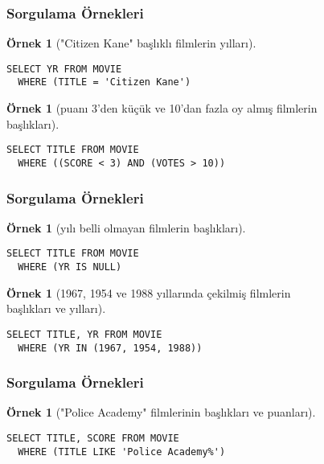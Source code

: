 \documentclass[dvipsnames]{beamer}
\theoremstyle{definition}
\theoremstyle{example}
\newtheorem{ornek}[theorem]{Örnek}
\theoremstyle{plain}
\begin{document}
\begin{frame}[fragile]
  \frametitle{Sorgulama Örnekleri}

  \begin{ornek}["Citizen Kane" başlıklı filmlerin yılları]
    \begin{lstlisting}
SELECT YR FROM MOVIE
  WHERE (TITLE = 'Citizen Kane')
    \end{lstlisting}
  \end{ornek}

  \pause
  \begin{ornek}[puanı 3'den küçük ve 10'dan fazla oy almış filmlerin\\
                başlıkları]
    \begin{lstlisting}
SELECT TITLE FROM MOVIE
  WHERE ((SCORE < 3) AND (VOTES > 10))
    \end{lstlisting}
  \end{ornek}
\end{frame}

\begin{frame}[fragile]
  \frametitle{Sorgulama Örnekleri}

  \begin{ornek}[yılı belli olmayan filmlerin başlıkları]
    \begin{lstlisting}
SELECT TITLE FROM MOVIE
  WHERE (YR IS NULL)
    \end{lstlisting}
  \end{ornek}

  \pause
  \begin{ornek}[1967, 1954 ve 1988 yıllarında çekilmiş filmlerin\\
                başlıkları ve yılları]
    \begin{lstlisting}
SELECT TITLE, YR FROM MOVIE
  WHERE (YR IN (1967, 1954, 1988))
    \end{lstlisting}
  \end{ornek}
\end{frame}

\begin{frame}[fragile]
  \frametitle{Sorgulama Örnekleri}

  \begin{ornek}["Police Academy" filmlerinin başlıkları ve puanları]
    \begin{lstlisting}
SELECT TITLE, SCORE FROM MOVIE
  WHERE (TITLE LIKE 'Police Academy%')
    \end{lstlisting}
  \end{ornek}
\end{frame}
\end{document}
